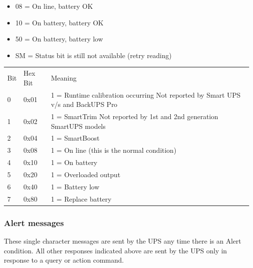 {{{{{{{{{{{{{{{{{\begin{itemize}
\item 08 = On line, battery OK  
\item 10 = On battery, battery OK  
\item 50 = On battery, battery low  
\item SM = Status bit is still not available (retry reading) 
\end{itemize}

\begin{longtable}{lll}
{Bit} & {Hex Bit} & {Meaning 
 } \\
{0} & {0x01} & {1 = Runtime calibration occurring Not reported by Smart UPS
v/s and BackUPS Pro 
 } \\
{1} & {0x02} & {1 = SmartTrim Not reported by 1st and 2nd generation SmartUPS
models 
 } \\
{2} & {0x04} & {1 = SmartBoost 
 } \\
{3} & {0x08} & {1 = On line (this is the normal condition) 
 } \\
{4} & {0x10} & {1 = On battery 
 } \\
{5} & {0x20} & {1 = Overloaded output 
 } \\
{6} & {0x40} & {1 = Battery low 
 } \\
{7} & {0x80} & {1 = Replace battery  
}

\end{longtable}

\label{Alert-messages}

\subsubsection*{Alert messages}

These single character messages are sent by the UPS any time there is an Alert
condition. All other responses indicated above are sent by the UPS only in
response to a query or action command.  

}}}}}}}}}}}}}}}}}
